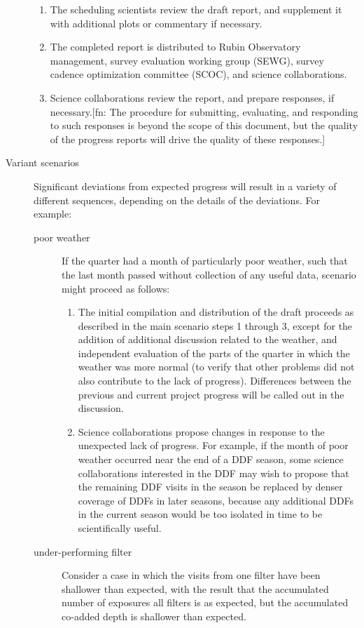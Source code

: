 \begin{description}
\begin{enumerate}
\item The scheduling scientists review the draft report, and supplement it with additional plots or commentary if necessary.
\item The completed report is distributed to Rubin Observatory management, survey evaluation working group (SEWG), survey cadence optimization committee (SCOC), and science collaborations.
\item Science collaborations review the report, and prepare responses, if necessary.[fn: The procedure for submitting, evaluating, and responding to such responses is beyond the scope of this document, but the quality of the progress reports will drive the quality of these responses.]
\end{enumerate}
\item[{Variant scenarios}] Significant deviations from expected progress will result in a variety of different sequences, depending on the details of the deviations. For example:
\begin{description}
\item[{poor weather}] If the quarter had a month of particularly poor weather, such that the last month passed without collection of any useful data, scenario might proceed as follows:
\begin{enumerate}
\item The initial compilation and distribution of the draft proceeds as described in the main scenario steps 1 through 3, except for the addition of additional discussion related to the weather, and independent evaluation of the parts of the quarter in which the weather was more normal (to verify that other problems did not also contribute to the lack of progress). Differences between the previous and current project progress will be called out in the discussion.
\item Science collaborations propose changes in response to the unexpected lack of progress. For example, if the month of poor weather occurred near the end of a DDF season, some science collaborations interested in the DDF may wish to propose that the remaining DDF visits in the season be replaced by denser coverage of DDFs in later seasons, because any additional DDFs in the current season would be too isolated in time to be scientifically useful.
\end{enumerate}
\item[{under-performing filter}] Consider a case in which the visits from one filter have been shallower than expected, with the result that the accumulated number of exposures all filters is as expected, but the accumulated co-added depth is shallower than expected.

\end{description}
\end{description}
